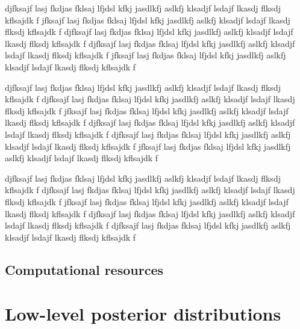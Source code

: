 \documentclass[twocolumn]{../../common/aa}
\begin{document}
djfksajf lasj fkdjas fklsaj lfjdsl kfkj jasdlkfj aslkfj klsadjf lsdajf lkasdj flksdj kflsajdk f
jfksajf lasj fkdjas fklsaj lfjdsl kfkj jasdlkfj aslkfj klsadjf lsdajf lkasdj flksdj kflsajdk f
djfksajf lasj fkdjas fklsaj lfjdsl kfkj jasdlkfj aslkfj klsadjf lsdajf lkasdj flksdj kflsajdk f
djfksajf lasj fkdjas fklsaj lfjdsl kfkj jasdlkfj aslkfj klsadjf lsdajf lkasdj flksdj kflsajdk f
jfksajf lasj fkdjas fklsaj lfjdsl kfkj jasdlkfj aslkfj klsadjf lsdajf lkasdj flksdj kflsajdk f

djfksajf lasj fkdjas fklsaj lfjdsl kfkj jasdlkfj aslkfj klsadjf lsdajf lkasdj flksdj kflsajdk f
djfksajf lasj fkdjas fklsaj lfjdsl kfkj jasdlkfj aslkfj klsadjf lsdajf lkasdj flksdj kflsajdk f
jfksajf lasj fkdjas fklsaj lfjdsl kfkj jasdlkfj aslkfj klsadjf lsdajf lkasdj flksdj kflsajdk f
djfksajf lasj fkdjas fklsaj lfjdsl kfkj jasdlkfj aslkfj klsadjf lsdajf lkasdj flksdj kflsajdk f
djfksajf lasj fkdjas fklsaj lfjdsl kfkj jasdlkfj aslkfj klsadjf lsdajf lkasdj flksdj kflsajdk f
jfksajf lasj fkdjas fklsaj lfjdsl kfkj jasdlkfj aslkfj klsadjf lsdajf lkasdj flksdj kflsajdk f

djfksajf lasj fkdjas fklsaj lfjdsl kfkj jasdlkfj aslkfj klsadjf lsdajf lkasdj flksdj kflsajdk f
djfksajf lasj fkdjas fklsaj lfjdsl kfkj jasdlkfj aslkfj klsadjf lsdajf lkasdj flksdj kflsajdk f
jfksajf lasj fkdjas fklsaj lfjdsl kfkj jasdlkfj aslkfj klsadjf lsdajf lkasdj flksdj kflsajdk f
djfksajf lasj fkdjas fklsaj lfjdsl kfkj jasdlkfj aslkfj klsadjf lsdajf lkasdj flksdj kflsajdk f
djfksajf lasj fkdjas fklsaj lfjdsl kfkj jasdlkfj aslkfj klsadjf lsdajf lkasdj flksdj kflsajdk f

\subsection{Computational resources}
\label{sec:resources}




\section{Low-level posterior distributions}
\label{sec:lowlevel}
\end{document}
